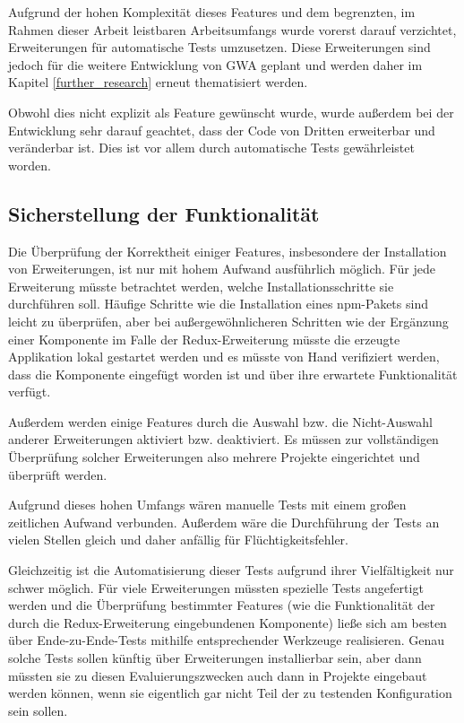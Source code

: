 Aufgrund der hohen Komplexität dieses Features und dem begrenzten, im Rahmen dieser Arbeit leistbaren Arbeitsumfangs wurde vorerst darauf verzichtet, Erweiterungen für automatische Tests umzusetzen. Diese Erweiterungen sind jedoch für die weitere Entwicklung von \gls{GWA} geplant und werden daher im Kapitel \ref{further_research} erneut thematisiert werden.

Obwohl dies nicht explizit als Feature gewünscht wurde, wurde außerdem bei der Entwicklung sehr darauf geachtet, dass der Code von Dritten erweiterbar und veränderbar ist. Dies ist vor allem durch automatische Tests gewährleistet worden.

\subsection{Sicherstellung der Funktionalität}
Die Überprüfung der Korrektheit einiger Features, insbesondere der Installation von Erweiterungen, ist nur mit hohem Aufwand ausführlich möglich. Für jede Erweiterung müsste betrachtet werden, welche Installationsschritte sie durchführen soll. Häufige Schritte wie die Installation eines \gls{npm}-Pakets sind leicht zu überprüfen, aber bei außergewöhnlicheren Schritten wie der Ergänzung einer Komponente im Falle der Redux-Erweiterung müsste die erzeugte Applikation lokal gestartet werden und es müsste von Hand verifiziert werden, dass die Komponente eingefügt worden ist und über ihre erwartete Funktionalität verfügt.

Außerdem werden einige Features durch die Auswahl bzw. die Nicht-Auswahl anderer Erweiterungen aktiviert bzw. deaktiviert. Es müssen zur vollständigen Überprüfung solcher Erweiterungen also mehrere Projekte eingerichtet und überprüft werden.

Aufgrund dieses hohen Umfangs wären manuelle Tests mit einem großen zeitlichen Aufwand verbunden. Außerdem wäre die Durchführung der Tests an vielen Stellen gleich und daher anfällig für Flüchtigkeitsfehler.

Gleichzeitig ist die Automatisierung dieser Tests aufgrund ihrer Vielfältigkeit nur schwer möglich. Für viele Erweiterungen müssten spezielle Tests angefertigt werden und die Überprüfung bestimmter Features (wie die Funktionalität der durch die Redux-Erweiterung eingebundenen Komponente) ließe sich am besten über Ende-zu-Ende-Tests mithilfe entsprechender Werkzeuge realisieren. Genau solche Tests sollen künftig über Erweiterungen installierbar sein, aber dann müssten sie zu diesen Evaluierungszwecken auch dann in Projekte eingebaut werden können, wenn sie eigentlich gar nicht Teil der zu testenden Konfiguration sein sollen.

